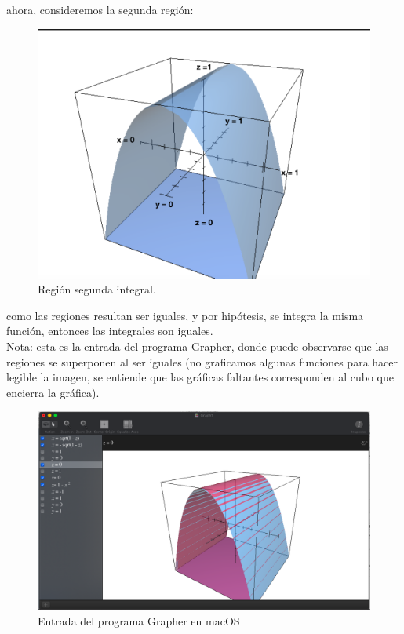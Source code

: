 \documentclass[11pt]{report}
\begin{document}
ahora, consideremos la segunda región:
\begin{figure}[H]
	\includegraphics[scale=0.3]{graph2.png}
	\centering
	\caption{Región segunda integral.}
	\centering
\end{figure}

como las regiones resultan ser iguales, y por hipótesis, se integra la misma
función, entonces las integrales son iguales.\\

Nota: esta es la entrada del programa Grapher, donde puede observarse que
las regiones se superponen al ser iguales (no graficamos algunas funciones
para hacer legible la imagen, se entiende que las gráficas faltantes
corresponden al cubo que encierra la gráfica).

\begin{figure}[H]
	\includegraphics[scale=0.3]{grapher.png}
	\centering
	\caption{Entrada del programa Grapher en macOS}
	\centering
\end{figure}
\end{document}
